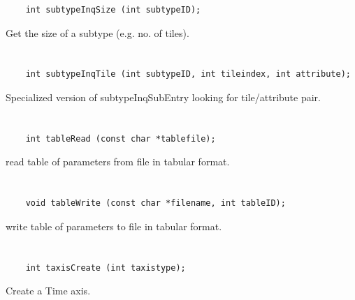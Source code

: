 \begin{verbatim}
    int subtypeInqSize (int subtypeID);
\end{verbatim}

Get the size of a subtype (e.g. no. of tiles).


\section*{\tt {}}

\begin{verbatim}
    int subtypeInqTile (int subtypeID, int tileindex, int attribute);
\end{verbatim}

Specialized version of subtypeInqSubEntry looking for tile/attribute pair.


\section*{\tt {}}

\begin{verbatim}
    int tableRead (const char *tablefile);
\end{verbatim}

read table of parameters from file in tabular format.


\section*{\tt {}}

\begin{verbatim}
    void tableWrite (const char *filename, int tableID);
\end{verbatim}

write table of parameters to file in tabular format.


\section*{\tt {}}

\begin{verbatim}
    int taxisCreate (int taxistype);
\end{verbatim}

Create a Time axis.


\section*{\tt {}}

